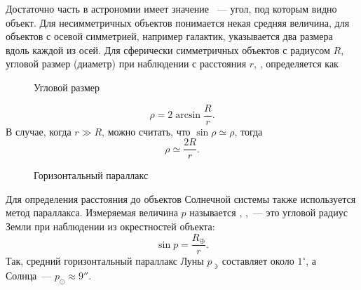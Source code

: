 Достаточно часть в астрономии имеет значение ~--- угол, под которым видно объект. Для несимметричных объектов понимается некая средняя величина, для объектов с осевой симметрией, например галактик, указывается два размера вдоль каждой из осей. Для сферически симметричных объектов с радиусом $R$, угловой размер (диаметр) при наблюдении с расстояния $r$, , определяется как\\
\begin{wrapfigure}[9]{r}{0.45\tw}
        \centering
        \vspace{-2pc}
        \caption{Угловой размер}
        \label{pic:angilar-size}
    \end{wrapfigure}
\vspace{-2pc}
\begin{equation}
    \rho = 2 \arcsin \frac{R}{r}.
\end{equation}
В случае, когда $r\gg R$, можно считать, что $\sin \rho \simeq \rho$, тогда
\begin{equation}
    \rho \simeq \frac{2 R}{r}.
\end{equation}

\begin{wrapfigure}[6]{r}{0.45\tw}
    \centering
    \vspace{-1.5pc}
    
    \caption{Горизонтальный параллакс}
    \label{pic:horizontal-parallax}
\end{wrapfigure}
Для определения расстояния до объектов Солнечной системы также используется метод параллакса. Измеряемая величина $p$ называется , ,~--- это угловой радиус Земли при наблюдении из окрестностей объекта:
\begin{equation}
    \sin p =\frac{R_\oplus}{r}.
\end{equation}
Так, средний горизонтальный параллакс Луны $p_{\rightmoon}$ составляет около $1^\circ$, а Солнца~--- $p_\odot \approx 9''$.
